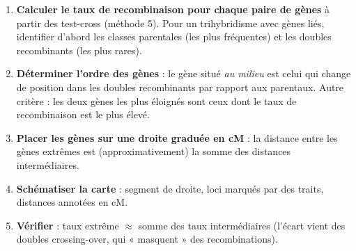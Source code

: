 \documentclass[11pt]{article}
\begin{document}
\begin{methode}
\begin{enumerate}
\item \textbf{Calculer le taux de recombinaison pour chaque paire de gènes} à partir des test-cross (méthode 5). Pour un trihybridisme avec gènes liés, identifier d'abord les classes parentales (les plus fréquentes) et les doubles recombinants (les plus rares).
\item \textbf{Déterminer l'ordre des gènes} : le gène situé \emph{au milieu} est celui qui change de position dans les doubles recombinants par rapport aux parentaux. Autre critère : les deux gènes les plus éloignés sont ceux dont le taux de recombinaison est le plus élevé.
\item \textbf{Placer les gènes sur une droite graduée en cM} : la distance entre les gènes extrêmes est (approximativement) la somme des distances intermédiaires.
\item \textbf{Schématiser la carte} : segment de droite, loci marqués par des traits, distances annotées en cM.
\item \textbf{Vérifier} : taux extrême $\approx$ somme des taux intermédiaires (l'écart vient des doubles crossing-over, qui « masquent » des recombinations).
\end{enumerate}
\end{methode}
\end{document}

